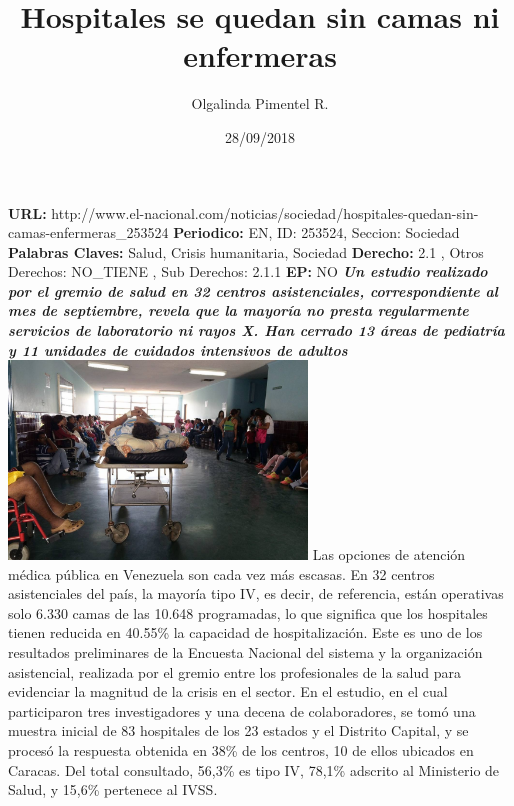 \documentclass{article}%
\title{\textbf{Hospitales se quedan sin camas ni enfermeras}}%
\author{Olgalinda Pimentel R.}%
\date{28/09/2018}%
\begin{document}
%
\normalsize%
\maketitle%
\textbf{URL: }%
http://www.el{-}nacional.com/noticias/sociedad/hospitales{-}quedan{-}sin{-}camas{-}enfermeras\_253524\newline%
%
\textbf{Periodico: }%
EN, %
ID: %
253524, %
Seccion: %
Sociedad\newline%
%
\textbf{Palabras Claves: }%
Salud, Crisis humanitaria, Sociedad\newline%
%
\textbf{Derecho: }%
2.1%
, Otros Derechos: %
NO\_TIENE%
, Sub Derechos: %
2.1.1%
\newline%
%
\textbf{EP: }%
NO\newline%
\newline%
%
\textbf{\textit{Un estudio realizado por el gremio de salud en 32 centros asistenciales, correspondiente al mes de septiembre, revela que la mayoría no presta regularmente servicios de laboratorio ni rayos X. Han cerrado 13 áreas de pediatría y 11 unidades de cuidados intensivos de adultos ~}}%
\newline%
\newline%
%
\includegraphics[width=300px]{118.jpg}%
\newline%
%
Las opciones de atención médica pública en Venezuela son cada vez más escasas. En 32 centros asistenciales del país, la mayoría tipo IV, es decir, de referencia, están operativas solo 6.330 camas de las 10.648 programadas, lo que significa que los hospitales tienen reducida en 40.55\% la capacidad de hospitalización.%
\newline%
%
Este es uno de los resultados preliminares de la Encuesta Nacional del sistema y la organización asistencial, realizada por el gremio entre los profesionales de la salud para evidenciar la magnitud de la crisis en el sector. En el estudio, en el cual participaron tres investigadores y una decena de colaboradores, se tomó una muestra inicial de 83 hospitales de los 23 estados y el Distrito Capital, y se procesó la respuesta obtenida en 38\% de los centros, 10 de ellos ubicados en Caracas. Del total consultado, 56,3\% es tipo IV, 78,1\% adscrito al Ministerio de Salud, y 15,6\% pertenece al IVSS.%
\end{document}
